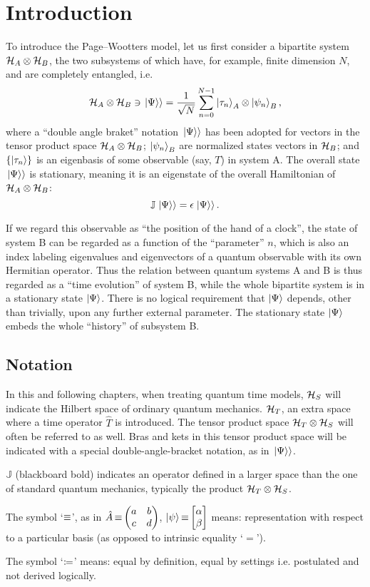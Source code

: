 \section{Introduction}

To introduce the Page--Wootters model, let us first consider
a bipartite system $\mathcal{H}_A \otimes \mathcal{H}_B$,
the two subsystems of which have, for example, finite dimension $N$,
and are completely
entangled, i.e.
$$
  \mathcal{H}_A \otimes \mathcal{H}_B \ni \left.\left| \Psi \right\rangle\right\rangle
  =
  \frac{1}{\sqrt{N}} \sum_{n=0}^{N-1} \ket{\tau_{n}}_{A} \otimes \ket{\psi_{n}}_{B} \text{,}
$$
where
a ``double angle braket'' notation $\left.\left| \Psi \right\rangle\right\rangle$ has been adopted
for vectors in the tensor product space $\mathcal{H}_A \otimes \mathcal{H}_B$;
$\ket{\psi_{n}}_{B}$ are normalized states vectors in $\mathcal{H}_B$;
and
$\qty{\ket{{\tau}_n}}$ is an eigenbasis of some observable (say, $T$) in system A.
The overall state $\left.\left| \Psi \right\rangle\right\rangle$ is stationary, meaning it is an eigenstate
of the overall Hamiltonian of $\mathcal{H}_A \otimes \mathcal{H}_B$:
$$
  \mathbb{J} \left.\left| \Psi \right\rangle\right\rangle = \epsilon \left.\left| \Psi \right\rangle\right\rangle \text{.}
$$

If we regard this observable as ``the position of the hand of a clock'',
the state of system B can be regarded as a function of the ``parameter'' $n$,
which is also an index labeling
eigenvalues and eigenvectors of a quantum observable
with its own Hermitian operator.
Thus the relation between quantum systems A and B is thus regarded as
a ``time evolution'' of system B,
while the whole bipartite system
is in a stationary state
$\ket{\Psi}$.
There is no logical requirement that $\ket{\Psi}$
depends, other than trivially,
upon any further external parameter.
The stationary state $\ket{\Psi}$ embeds the whole ``history''
of subsystem B.

\subsection*{Notation}

In this and following chapters, when treating quantum time models,
$\mathcal{H}_S$ will indicate the Hilbert space of ordinary quantum mechanics.
$\mathcal{H}_T$, an extra space where a time operator $\hat{T}$ is introduced. The tensor
product space $\mathcal{H}_T \otimes \mathcal{H}_S$
will often be referred to as well.
Bras and kets in this tensor product space will be indicated with a special double-angle-bracket
notation, as in $\left.\left| \Psi \right\rangle\right\rangle$.

${\mathbb{J}}$ (blackboard bold) indicates an  operator defined in
a larger space than the one of standard quantum mechanics,
typically the product $\mathcal{H}_T \otimes \mathcal{H}_S$.

The symbol `$\operatorname*{\equiv}$', as in $\hat{A} \repr \mqty(a&b\\c&d)$, $\ket{\psi} \repr \mqty[\alpha \\ \beta]$
means: representation with respect to a particular basis (as opposed to intrinsic equality `$=$').

The symbol `$\coloneqq$'
means: equal by definition, equal by settings i.e. postulated and not derived logically.
